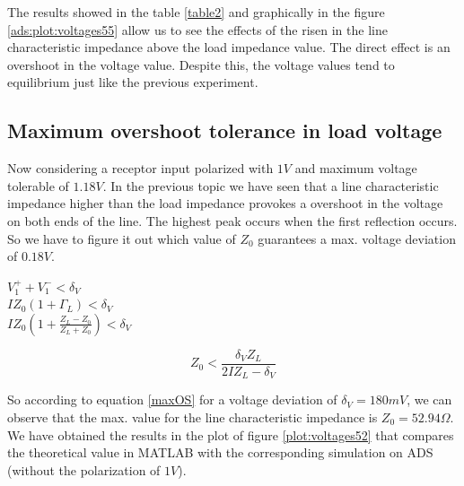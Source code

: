 The results showed in the table \ref{table2} and graphically in the figure \ref{ads:plot:voltages55} allow us to see the effects of the risen in the line characteristic impedance above the load impedance value. The direct effect is an overshoot in the voltage value. Despite this, the voltage values tend to equilibrium just like the previous experiment.

\subsection{Maximum overshoot tolerance in load voltage}

Now considering a receptor input polarized with $1V$ and maximum voltage tolerable of $1.18V$. In the previous topic we have seen that a line characteristic impedance higher than the load impedance provokes a overshoot in the voltage on both ends of the line. The highest peak occurs when the first reflection occurs. So we have to figure it out which value of $Z_0$ guarantees a max. voltage deviation of $0.18 V$.

\begin{center}
    $V_1^+ + V_1^- < \delta_V$ \\ \vspace{1pt}
    $IZ_0 (1+ \Gamma_L) < \delta_V$ \\ \vspace{1pt}
    $IZ_0 \left(1+ \frac{Z_L - Z_0}{Z_L + Z_0}\right)< \delta_V$ 
\end{center}
\begin{equation} \label{maxOS}
    Z_0 < \frac{\delta_V Z_L}{2IZ_L-\delta_V}
\end{equation}

So according to equation \ref{maxOS} for a voltage deviation of $\delta_V = 180 mV$, we can observe that the max. value for the line characteristic impedance is $Z_0 = 52.94 \Omega$. We have obtained the results in the plot of figure \ref{plot:voltages52} that compares the theoretical value in MATLAB with the corresponding simulation on ADS (without the polarization of $1V$).

